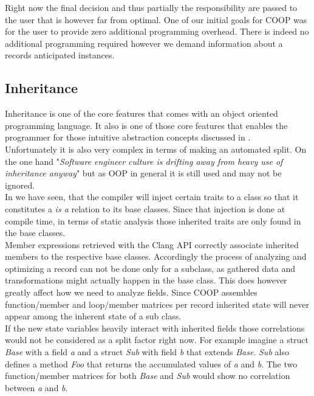 Right now the final decision and thus partially the responsibility are passed to the user that is however far from optimal. One of our initial goals for COOP was for the user to provide zero additional programming overhead. There is indeed no additional programming required however we demand information about a records anticipated instances.

\subsection{Inheritance}\label{inheritance}
Inheritance is one of the core features that comes with an object oriented programming language. It also is one of those core features that enables the programmer for those intuitive abstraction concepts discussed in .\\
Unfortunately it is also very complex in terms of making an automated split. On the one hand "\textit{Software engineer culture is drifting away from heavy use of inheritance anyway}"  but as OOP in general it is still used and may not be ignored.\\
In  we have seen, that the compiler will inject certain traits to a class so that it constitutes a \textit{is a} relation to its base classes. Since that injection is done at compile time, in terms of static analysis those inherited traits are only found in the base classes.\\
Member expressions retrieved with the Clang API correctly associate inherited members to the respective base classes. Accordingly the process of analyzing and optimizing a record can not be done only for a subclass, as gathered data and transformations might actually happen in the base class. This does however greatly affect how we need to analyze fields. Since COOP assembles function/member and loop/member matrices per record inherited state will never appear among the inherent state of a sub class.\\
If the new state variables heavily interact with inherited fields those correlations would not be considered as a split factor right now. For example imagine a struct \textit{Base} with a field \textit{a} and a struct \textit{Sub} with field \textit{b} that extends \textit{Base}. \textit{Sub} also defines a method \textit{Foo} that returns the accumulated values of \textit{a} and \textit{b}. The two function/member matrices for both \textit{Base} and \textit{Sub} would show no correlation between \textit{a} and \textit{b}.
\newpage
